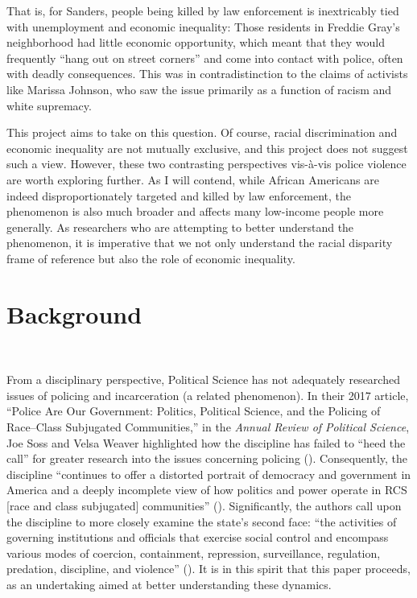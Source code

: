 \documentclass[12pt]{article}
\begin{document}
That is, for Sanders, people being killed by law enforcement is inextricably tied with unemployment and economic inequality: Those residents in Freddie Gray’s neighborhood had little economic opportunity, which meant that they would frequently “hang out on street corners” and come into contact with police, often with deadly consequences. This was in contradistinction to the claims of activists like Marissa Johnson, who saw the issue primarily as a function of racism and white supremacy.

This project aims to take on this question. Of course, racial discrimination and economic inequality are not mutually exclusive, and this project does not suggest such a view. However, these two contrasting perspectives vis-à-vis police violence are worth exploring further. As I will contend, while African Americans are indeed disproportionately targeted and killed by law enforcement, the phenomenon is also much broader and affects many low-income people more generally. As researchers who are attempting to better understand the phenomenon, it is imperative that we not only understand the racial disparity frame of reference but also the role of economic inequality.

\section{Background}\

From a disciplinary perspective, Political Science has not adequately researched issues of policing and incarceration (a related phenomenon). In their 2017 article, “Police Are Our Government: Politics, Political Science, and the Policing of Race–Class Subjugated Communities,” in the \textit{Annual Review of Political Science}, Joe Soss and Velsa Weaver highlighted how the discipline has failed to “heed the call” for greater research into the issues concerning policing (\citeyear[568]{sossPoliceAreOur2017}). Consequently, the discipline “continues to offer a distorted portrait of democracy and government in America and a deeply incomplete view of how politics and power operate in RCS [race and class subjugated] communities” (\cite[568]{sossPoliceAreOur2017}). Significantly, the authors call upon the discipline to more closely examine the state’s second face: “the activities of governing institutions and officials that exercise social control and encompass various modes of coercion, containment, repression, surveillance, regulation, predation, discipline, and violence” (\cite[567]{sossPoliceAreOur2017}). It is in this spirit that this paper proceeds, as an undertaking aimed at better understanding these dynamics.
\end{document}
